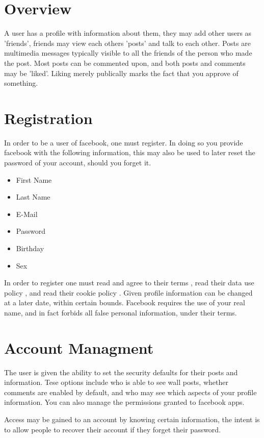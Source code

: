 \section{Overview}
A user has a profile with information about them, they may add other users as
'friends', friends may view each others 'posts' and talk to each other. Posts
are multimedia messages typically visible to all the friends of the person who
made the post. Most posts can be commented upon, and both posts and comments may
be 'liked'. Liking merely publically marks the fact that you approve of
something.

\section{Registration}
In order to be a user of facebook, one must register. In doing so you provide
facebook with the following information, this may also be used to later reset
the password of your account, should you forget it.

\begin{itemize}
\item First Name
\item Last Name
\item E-Mail
\item Password
\item Birthday
\item Sex
\end{itemize}

In order to register one must read and agree to their terms \cite{fbterms}, read
their data use policy \cite{fbdatause}, and read their cookie policy
\cite{fbcookies}.
Given profile information can be changed at a later date, within certain bounds.
Facebook requires the use of your real name, and in fact forbids all false
personal information, under their terms.\cite[4.1]{fbterms}

\section{Account Managment}
The user is given the ability to set the security defaults for their posts and
information. Tese options include who is able to see wall posts, whether
comments are enabled by default, and who may see which aspects of your profile
information. You can also manage the permissions granted to facebook apps.

Access may be gained to an account by knowing certain information, the intent is
to allow people to recover their account if they forget their password.

